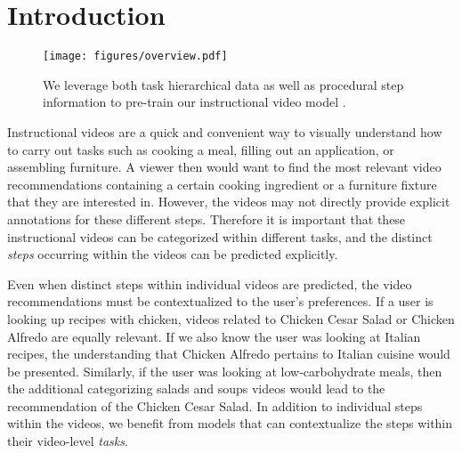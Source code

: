 \section{Introduction}

\begin{wrapfigure}{r}{0.5\textwidth}
  \begin{center}
\texttt{[image: figures/overview.pdf]}
\end{center}
\caption{We leverage both task hierarchical data as well as procedural step information to pre-train our instructional video model \model.}
\label{fig:overview}
\end{wrapfigure}

Instructional videos are a quick and convenient way to visually understand how to carry out tasks such as cooking a meal, filling out an application, or assembling furniture. A viewer then would want to find the most relevant video recommendations containing a certain cooking ingredient or a furniture fixture that they are interested in. However, the videos may not directly provide explicit annotations for these different steps. Therefore it is important that these instructional videos can be categorized within different tasks, and the distinct \emph{steps} occurring within the videos can be predicted explicitly.

Even when distinct steps within individual videos are predicted, the video recommendations must be contextualized to the user's preferences. If a user is looking up recipes with chicken, videos related to Chicken Cesar Salad or Chicken Alfredo are equally relevant. If we also know the user was looking at Italian recipes, the understanding that Chicken Alfredo pertains to Italian cuisine would be presented. Similarly, if the user was looking at low-carbohydrate meals, then the additional categorizing salads and soups videos would lead to the recommendation of the Chicken Cesar Salad. In addition to individual steps within the videos, we benefit from models that can contextualize the steps within their video-level \emph{tasks}.


